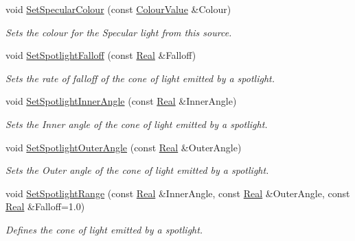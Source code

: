 \begin{DoxyCompactItemize}
void \hyperlink{classMezzanine_1_1Light_a920d4d00a76b5643e3f7318a92011bbf}{SetSpecularColour} (const \hyperlink{classMezzanine_1_1ColourValue}{ColourValue} \&Colour)
\begin{DoxyCompactList}\small\item\em Sets the colour for the Specular light from this source. \item\end{DoxyCompactList}\item 
void \hyperlink{classMezzanine_1_1Light_a2c729cbbcd38835159e82b3a7a3a2963}{SetSpotlightFalloff} (const \hyperlink{namespaceMezzanine_a726731b1a7df72bf3583e4a97282c6f6}{Real} \&Falloff)
\begin{DoxyCompactList}\small\item\em Sets the rate of falloff of the cone of light emitted by a spotlight. \item\end{DoxyCompactList}\item 
void \hyperlink{classMezzanine_1_1Light_a2ceaa2d5334fc944613f21ef705914ad}{SetSpotlightInnerAngle} (const \hyperlink{namespaceMezzanine_a726731b1a7df72bf3583e4a97282c6f6}{Real} \&InnerAngle)
\begin{DoxyCompactList}\small\item\em Sets the Inner angle of the cone of light emitted by a spotlight. \item\end{DoxyCompactList}\item 
void \hyperlink{classMezzanine_1_1Light_a233ded1ccf6c7fe3fb83533ab1e8bb2a}{SetSpotlightOuterAngle} (const \hyperlink{namespaceMezzanine_a726731b1a7df72bf3583e4a97282c6f6}{Real} \&OuterAngle)
\begin{DoxyCompactList}\small\item\em Sets the Outer angle of the cone of light emitted by a spotlight. \item\end{DoxyCompactList}\item 
void \hyperlink{classMezzanine_1_1Light_aebd96e0d10af9a5a6ad008d4360b649f}{SetSpotlightRange} (const \hyperlink{namespaceMezzanine_a726731b1a7df72bf3583e4a97282c6f6}{Real} \&InnerAngle, const \hyperlink{namespaceMezzanine_a726731b1a7df72bf3583e4a97282c6f6}{Real} \&OuterAngle, const \hyperlink{namespaceMezzanine_a726731b1a7df72bf3583e4a97282c6f6}{Real} \&Falloff=1.0)
\begin{DoxyCompactList}\small\item\em Defines the cone of light emitted by a spotlight. \item\end{DoxyCompactList}\end{DoxyCompactItemize}
